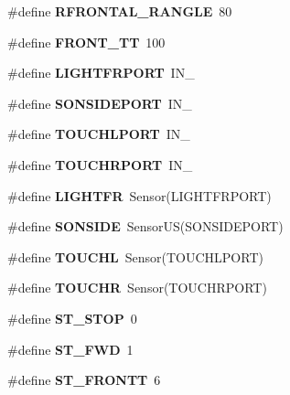 \begin{DoxyCompactItemize}
\item 
\hypertarget{fence_8nxc_a70438bca69ec65d9a29a9f120922464d}{
\#define {\bfseries RFRONTAL\_\-RANGLE}~80}
\label{fence_8nxc_a70438bca69ec65d9a29a9f120922464d}

\item 
\hypertarget{fence_8nxc_a7861c2174f24a87c43840f87f3cf8a14}{
\#define {\bfseries FRONT\_\-TT}~100}
\label{fence_8nxc_a7861c2174f24a87c43840f87f3cf8a14}

\item 
\hypertarget{fence_8nxc_ab9d3d1049b45438591608c99774c5cba}{
\#define {\bfseries LIGHTFRPORT}~IN\_}
\label{fence_8nxc_ab9d3d1049b45438591608c99774c5cba}

\item 
\hypertarget{fence_8nxc_a73b327cc697b593b06f47bc6915ba9cf}{
\#define {\bfseries SONSIDEPORT}~IN\_}
\label{fence_8nxc_a73b327cc697b593b06f47bc6915ba9cf}

\item 
\hypertarget{fence_8nxc_a867a2479cd5e144bc98b3e24bd48a79c}{
\#define {\bfseries TOUCHLPORT}~IN\_}
\label{fence_8nxc_a867a2479cd5e144bc98b3e24bd48a79c}

\item 
\hypertarget{fence_8nxc_ac16330478e7b003e00f37e90e0c5bdf6}{
\#define {\bfseries TOUCHRPORT}~IN\_}
\label{fence_8nxc_ac16330478e7b003e00f37e90e0c5bdf6}

\item 
\hypertarget{fence_8nxc_a26fd581a2d8a8f58a30535495c8d0843}{
\#define {\bfseries LIGHTFR}~Sensor(LIGHTFRPORT)}
\label{fence_8nxc_a26fd581a2d8a8f58a30535495c8d0843}

\item 
\hypertarget{fence_8nxc_aec1d71dea61f39acce761840c4ce0d27}{
\#define {\bfseries SONSIDE}~SensorUS(SONSIDEPORT)}
\label{fence_8nxc_aec1d71dea61f39acce761840c4ce0d27}

\item 
\hypertarget{fence_8nxc_a98c4f75c182ff1c7c6f3fb288f4f3857}{
\#define {\bfseries TOUCHL}~Sensor(TOUCHLPORT)}
\label{fence_8nxc_a98c4f75c182ff1c7c6f3fb288f4f3857}

\item 
\hypertarget{fence_8nxc_a6537370af17fd38a56bcf670d8db23e3}{
\#define {\bfseries TOUCHR}~Sensor(TOUCHRPORT)}
\label{fence_8nxc_a6537370af17fd38a56bcf670d8db23e3}

\item 
\hypertarget{fence_8nxc_a8ccbe4f289c6182e18589c6f2c6108ee}{
\#define {\bfseries ST\_\-STOP}~0}
\label{fence_8nxc_a8ccbe4f289c6182e18589c6f2c6108ee}

\item 
\hypertarget{fence_8nxc_abba849981e74e84eb3836d3c03c363a9}{
\#define {\bfseries ST\_\-FWD}~1}
\label{fence_8nxc_abba849981e74e84eb3836d3c03c363a9}

\item 
\hypertarget{fence_8nxc_a82671cbfd87d61e73ed46e39a25ea515}{
\#define {\bfseries ST\_\-FRONTT}~6}
\label{fence_8nxc_a82671cbfd87d61e73ed46e39a25ea515}

\end{DoxyCompactItemize}
